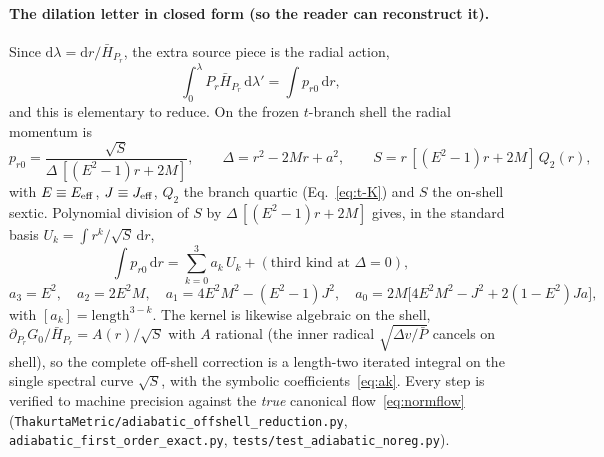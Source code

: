 \documentclass[12pt]{iopart}
\newcommand{\dd}{\mathrm{d}}
\begin{document}
\paragraph{The dilation letter in closed form (so the reader can reconstruct it).}
Since $\dd\lambda=\dd r/\bar H_{P_r}$, the extra source piece is the radial action,
\begin{equation}
    \int_0^{\lambda}P_r\bar H_{P_r}\,\dd\lambda'=\int p_{r0}\,\dd r,
    \label{eq:dilation-action}
\end{equation}
and this is elementary to reduce. On the frozen $t$-branch shell the radial momentum is
\begin{equation}
    p_{r0}=\frac{\sqrt{S}}{\Delta\,[(E^2-1)r+2M]},\qquad
    \Delta=r^2-2Mr+a^2,\qquad S=r\,[(E^2-1)r+2M]\,Q_2(r),
    \label{eq:pr0-tbranch}
\end{equation}
with $E\equiv E_{\rm eff}$, $J\equiv J_{\rm eff}$, $Q_2$ the branch quartic (Eq.~\eqref{eq:t-K})
and $S$ the on-shell sextic. Polynomial division of $S$ by $\Delta\,[(E^2-1)r+2M]$ gives,
in the standard basis $U_k=\int r^k/\sqrt S\,\dd r$,
\begin{equation}
    \int p_{r0}\,\dd r=\sum_{k=0}^{3}a_k\,U_k+(\text{third kind at }\Delta=0),
    \label{eq:action-reduction}
\end{equation}
\begin{equation}
    a_3=E^2,\quad a_2=2E^2M,\quad a_1=4E^2M^2-(E^2-1)J^2,\quad
    a_0=2M\big[4E^2M^2-J^2+2(1-E^2)Ja\big],
    \label{eq:ak}
\end{equation}
with $[a_k]=\text{length}^{3-k}$. The kernel is likewise algebraic on the shell,
$\partial_{P_r}G_0/\bar H_{P_r}=A(r)/\sqrt S$ with $A$ rational (the inner radical
$\sqrt{\Delta v/\bar P}$ cancels on shell), so the complete off-shell correction is a
length-two iterated integral on the single spectral curve $\sqrt S$, with the symbolic
coefficients~\eqref{eq:ak}. Every step is verified to machine precision against the
\emph{true} canonical flow~\eqref{eq:normflow}
(\texttt{ThakurtaMetric/adiabatic\_offshell\_reduction.py},
\texttt{adiabatic\_first\_order\_exact.py}, \texttt{tests/test\_adiabatic\_noreg.py}).
\end{document}
